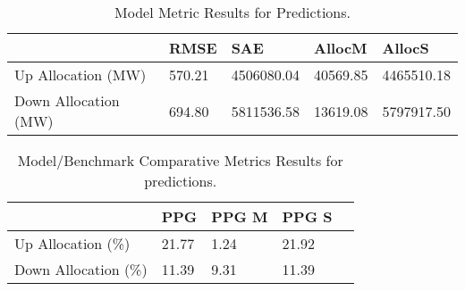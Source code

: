 \begin{table}[H] 
    \caption{Model Metric Results for Predictions. \label{pred_res_linear}}
    \begin{tabularx}{\textwidth}{CCCCC}
    \toprule
    & \textbf{RMSE}	& \textbf{SAE}	& \textbf{AllocM} & \textbf{AllocS}\\
    \midrule
    Up Allocation (MW) & 570.21 & 4506080.04 & 40569.85 & 4465510.18 \\
    Down Allocation (MW) & 694.80 & 5811536.58 & 13619.08 & 5797917.50 \\
        \bottomrule
    \end{tabularx}
\end{table}


\begin{table}[H] 
    \caption{Model/Benchmark Comparative Metrics Results for predictions. \label{pred_res}}
    \begin{tabularx}{\textwidth}{CCCCC}
    \toprule
    & \textbf{PPG}	& \textbf{PPG M}	& \textbf{PPG S} \\
    \midrule
    Up Allocation (\%) & 21.77 & 1.24 & 21.92 \\
    Down Allocation (\%) & 11.39 & 9.31 & 11.39 \\
        \bottomrule
    \end{tabularx}
\end{table}


